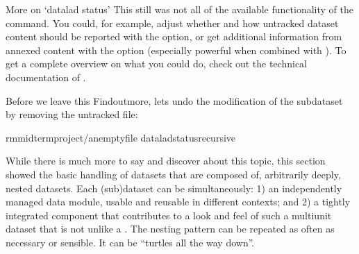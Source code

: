 \begin{findoutmore}[label={fom-status}, before title={\thetcbcounter\ }, float, check odd page=true]{More on ‘datalad status’}
\sphinxAtStartPar
This still was not all of the available functionality of the
 command. You could, for example, adjust whether and
how untracked dataset content should be reported with the 
option, or get additional information from annexed content with the 
option (especially powerful when combined with ). To get a complete overview on what you could do, check out the technical
documentation of  .

\sphinxAtStartPar
Before we leave this Find\sphinxhyphen{}out\sphinxhyphen{}more, lets undo the modification of the subdataset
by removing the untracked file:

\begin{sphinxVerbatim}[commandchars=\\\{\}]
rmmidterm\PYGZus{}project/an\PYGZus{}empty\PYGZus{}file
dataladstatus\PYGZhy{}\PYGZhy{}recursive
\end{sphinxVerbatim}


\end{findoutmore}

\sphinxAtStartPar
While there is much more to say and discover about this topic, this section showed the basic handling of datasets that are composed of, arbitrarily deeply, nested datasets.
Each (sub)dataset can be simultaneously: 1) an independently managed data module, usable and reusable in different contexts; and 2) a tightly integrated component that contributes to a look and feel of such a multi\sphinxhyphen{}unit dataset that is not unlike a .
The nesting pattern can be repeated as often as necessary or sensible.
It can be “turtles all the way down”.

\sphinxstepscope


